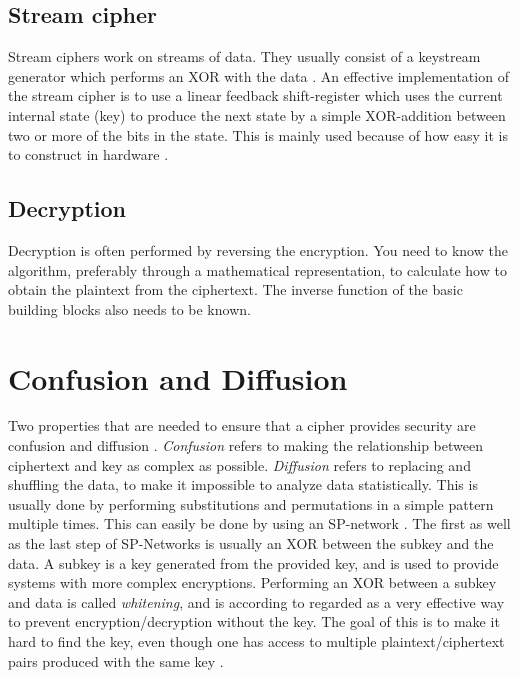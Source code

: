 \subsection{Stream cipher} \label{sec:StreamCipher}
Stream ciphers work on streams of data. They usually consist of a 
keystream generator which performs an XOR with the data 
\cite[pp. 67]{Simmons:1992}. An effective implementation of the stream 
cipher is to use a linear feedback shift-register which uses the 
current internal state (key) to produce the next state by a simple 
XOR-addition between two or more of the bits in the state. This is 
mainly used because of how easy it is to construct in hardware 
\citep{LFSR:2008}.

\subsection{Decryption}
Decryption is often performed by reversing the encryption. You need to 
know the algorithm, preferably through a mathematical representation, 
to calculate how to obtain the plaintext from the ciphertext. The 
inverse function of the basic building blocks also needs to be known.


\section{Confusion and Diffusion}\label{ch:ConfDiff}
Two properties that are needed to ensure that a cipher provides 
security are confusion and diffusion \citep{Shannon:1949}. 
\emph{Confusion} refers to making the relationship between ciphertext 
and key as complex as possible. \emph{Diffusion} refers to replacing 
and shuffling the data, to make it impossible to analyze data 
statistically. This is usually done by performing substitutions and 
permutations in a simple pattern multiple times. This can easily be 
done by using an SP-network \citep[pp. 74--79]{Stinson:2006}. The first
 as well as the last step of SP-Networks is usually an XOR between 
the subkey and the data. A subkey is a key generated from the provided 
key, and is used to provide systems with more complex encryptions. 
Performing an XOR between a subkey and data is called \emph{whitening}, 
and is according to \citet[p. 75]{Stinson:2006} regarded as a very 
effective way to prevent encryption/decryption without the key. 
The goal of this is to make it hard to find the key, even though one 
has access to multiple plaintext/ciphertext pairs produced with the 
same key \citep{Shannon:1949}.

